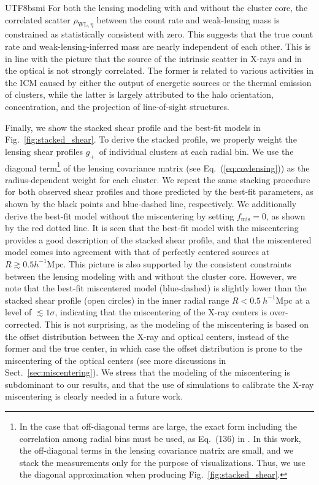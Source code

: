 \documentclass[longauth]{aa}
\newcommand{\Mpch}{\ensuremath{h^{-1}\mathrm{Mpc}}}
\newcommand{\gshear}{\ensuremath{g_{+}}}
\newcommand{\fmis}{\ensuremath{f_{\mathrm{mis}}}}
\newcommand{\rate}{\ensuremath{\eta}}
\begin{document}
\begin{CJK*}{UTF8}{bsmi}
For both the lensing modeling with and without the cluster core, the correlated scatter $\rho_{\mathrm{WL},\rate}$ between the count rate and weak-lensing mass is constrained as statistically consistent with zero.
This suggests that the true count rate and weak-lensing-inferred mass are nearly independent of each other.
This is in line with the picture that the source of the intrinsic scatter in X-rays and in the optical is not strongly correlated.
The former is related to various activities in the ICM caused by either the output of energetic sources or the thermal emission of clusters, while the latter is largely attributed to the halo orientation, concentration, and the projection of line-of-sight structures.

Finally, we show the stacked shear profile and the best-fit models in Fig.~\ref{fig:stacked_shear}.
To derive the stacked profile, we properly weight the lensing shear profiles \gshear\ of individual clusters at each radial bin.
We use the diagonal term\footnote{In the case that off-diagonal terms are large, the exact form including the correlation among radial bins must be used, as Eq.~(136) in \cite{umetsu20b}. In this work, the off-diagonal terms in the lensing covariance matrix are small, and we stack the measurements only for the purpose of visualizations. Thus, we use the diagonal approximation when producing Fig.~\ref{fig:stacked_shear}.} of the lensing covariance matrix (see Eq.~(\ref{eq:covlensing})) as the radius-dependent weight for each cluster.
We repeat the same stacking procedure for both observed shear profiles and those predicted by the best-fit parameters, as shown by the black points and blue-dashed line, respectively.
We additionally derive the best-fit model without the miscentering by setting $\fmis = 0$, as shown by the red dotted line.
It is seen that the best-fit model with the miscentering provides a good description of the stacked shear profile, and that the miscentered model comes into agreement with that of perfectly centered sources at $R\gtrsim0.5\Mpch$.
This picture is also supported by the consistent constraints between the lensing modeling with and without the cluster core.
However, we note that the best-fit miscentered model (blue-dashed) is slightly lower than the stacked shear profile (open circles) in the inner radial range $R<0.5~\Mpch$ at a level of $\lesssim1\sigma$, indicating  that the miscentering of the X-ray centers is over-corrected.
This is not surprising, as the modeling of the miscentering is based on the offset distribution between the X-ray and optical centers, 
instead of the former and the true center, 
in which case the offset distribution is prone to the miscentering of the optical centers (see more discussions in Sect.~\ref{sec:miscentering}).
We stress that the modeling of the miscentering is subdominant to our results, and that the use of simulations to calibrate the X-ray miscentering is clearly needed in a future work.


\end{CJK*}
\end{document}

